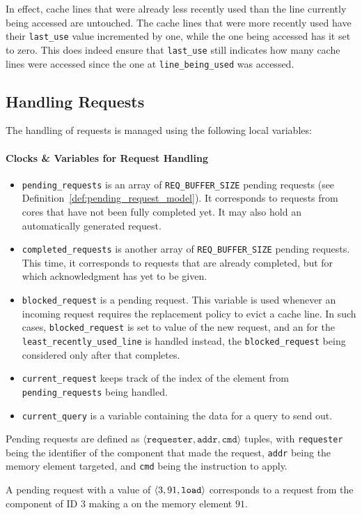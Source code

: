 In effect, cache lines that were already less recently used than the line
currently being accessed are untouched. The cache lines that were more recently
used have their \lstinline!last_use! value incremented by one, while the one
being accessed has it set to zero. This does indeed ensure that
\lstinline!last_use! still indicates how many cache lines were accessed since
the one at \lstinline!line_being_used! was accessed.

\subsection{Handling Requests}
\label{sec:model:cache:requests}
The handling of requests is managed using the following local variables:
\paragraph{Clocks \& Variables for Request Handling}
\begin{itemize}
\item
   \lstinline!pending_requests! is an array of \lstinline!REQ_BUFFER_SIZE!
   pending requests (see Definition~\ref{def:pending_request_model}). It
   corresponds to requests from cores that have not been fully completed yet.
   It may also hold an automatically generated \evictinstr{} request.
\item
   \lstinline!completed_requests! is another array of
   \lstinline!REQ_BUFFER_SIZE! pending requests. This time, it corresponds to
   requests that are already completed, but for which acknowledgment has yet to
   be given.
\item
   \lstinline!blocked_request! is a pending request. This variable is used
   whenever an incoming request requires the replacement policy to evict a cache
   line. In such cases, \lstinline!blocked_request! is set to value of the new
   request, and an \evictinstr{} for the \lstinline!least_recently_used_line! is
   handled instead, the \lstinline!blocked_request! being considered only after
   that \evictinstr{} completes.
\item
   \lstinline!current_request! keeps track of the index of the element from
   \lstinline!pending_requests! being handled.
\item
   \lstinline!current_query! is a variable containing the data for a query to send
   out.
\end{itemize}

\begin{definition}
\label{def:pending_request_model}
Pending requests are defined as $\langle \texttt{requester}, \texttt{addr},
\texttt{cmd}\rangle$ tuples, with \texttt{requester} being the identifier of
the component that made the request, \texttt{addr} being the memory element
targeted, and \texttt{cmd} being the instruction to apply.
\end{definition}
\begin{example}
A pending request with a value of $\langle 3, 91, \text{\texttt{load}}{} \rangle$
corresponds to a request from the component of ID $3$ making a \loadinstr{} on
the memory element $91$.
\end{example}

